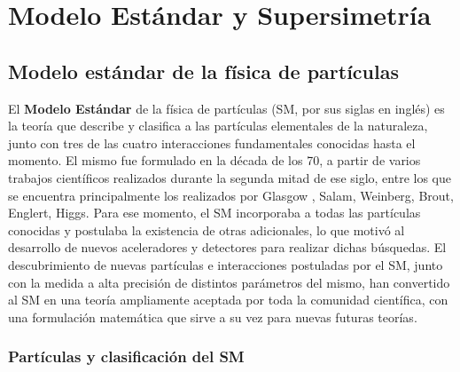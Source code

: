 \chapter{Modelo Estándar y Supersimetría}

\section{Modelo estándar de la física de partículas}

El \textbf{Modelo Estándar} de la física de partículas (SM, por sus siglas en inglés) es la teoría que describe y clasifica a las partículas elementales de la naturaleza, junto con tres de las cuatro interacciones fundamentales conocidas hasta el momento. El mismo fue formulado en la década de los 70, a partir de varios trabajos científicos realizados durante la segunda mitad de ese siglo, entre los que se encuentra principalmente los realizados por Glasgow \cite{Glashow:1961tr}, Salam\cite{salam}, Weinberg\cite{PhysRevLett.19.1264}, Brout, Englert, Higgs\cite{PhysRevLett.13.321, PhysRevLett.13.508,PhysRevLett.13.585}. Para ese momento, el SM incorporaba a todas las partículas conocidas y postulaba la existencia de otras adicionales, lo que motivó al desarrollo de nuevos aceleradores y detectores para realizar dichas búsquedas. El descubrimiento de nuevas partículas e interacciones postuladas por el SM, junto con la medida a alta precisión de distintos parámetros del mismo, han convertido al SM en una teoría ampliamente aceptada por toda la comunidad científica, con una formulación matemática que sirve a su vez para nuevas futuras teorías.

\subsection{Partículas y clasificación del SM}

